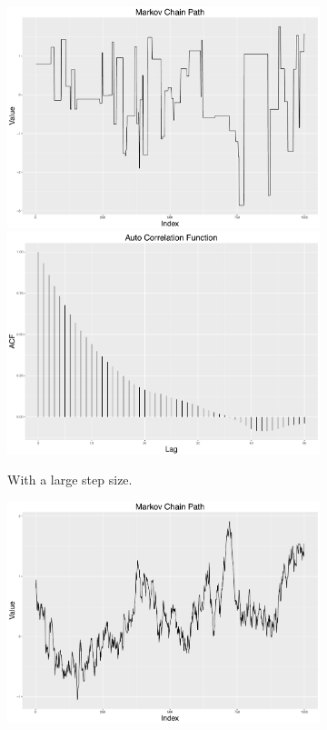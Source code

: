 \begin{figure}[h]
\centering
 \begin{subfigure}[b]{0.32\textwidth}
     \includegraphics[width=\textwidth]{Chapters/05MCMCOU/plots/gglargechain.pdf}
     \includegraphics[width=\textwidth]{Chapters/05MCMCOU/plots/gglargeacf.pdf}
     \caption{With a large step size.}
\end{subfigure}
\begin{subfigure}[b]{0.32\textwidth}
    \includegraphics[width=\textwidth]{Chapters/05MCMCOU/plots/ggsmallchain.pdf}

\end{subfigure}
\end{figure}
